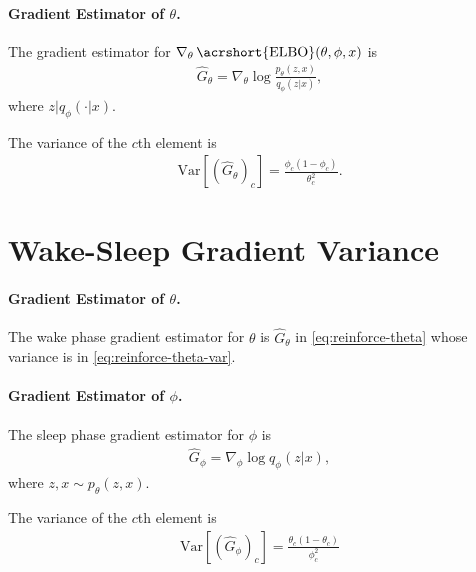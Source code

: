 \documentclass[a4paper]{article}
\DeclareMathOperator{\1}{{}\mathds{1}}
\DeclareMathOperator{\ELBO}{\acrshort{ELBO}}
\newcommand{\given}{\lvert}
\begin{document}
\paragraph{Gradient Estimator of $\theta$.}
The gradient estimator for $\nabla_\theta \ELBO(\theta, \phi, x)$ is
\begin{align}
  \hat G_\theta = \nabla_\theta \log \frac{p_\theta(z, x)}{q_\phi(z \given x)}, \label{eq:reinforce-theta}
\end{align}
where $z \given q_\phi(\cdot \given x)$.

The variance of the $c$th element is
\begin{align}
  \mathrm{Var}[(\hat G_\theta)_c] = \frac{\phi_c (1 - \phi_c)}{\theta_c^2}. \label{eq:reinforce-theta-var}
\end{align}

\section{Wake-Sleep Gradient Variance}
\paragraph{Gradient Estimator of $\theta$.} The wake phase gradient estimator for $\theta$ is $\hat G_\theta$ in \eqref{eq:reinforce-theta} whose variance is in \eqref{eq:reinforce-theta-var}.

\paragraph{Gradient Estimator of $\phi$.} The sleep phase gradient estimator for $\phi$ is
\begin{align}
  \hat G_\phi = \nabla_\phi \log q_\phi(z \given x),
\end{align}
where $z, x \sim p_\theta(z, x)$.

The variance of the $c$th element is
\begin{align}
  \mathrm{Var}[(\hat G_\phi)_c] = \frac{\theta_c (1 - \theta_c)}{\phi_c^2}
\end{align}
\end{document}
